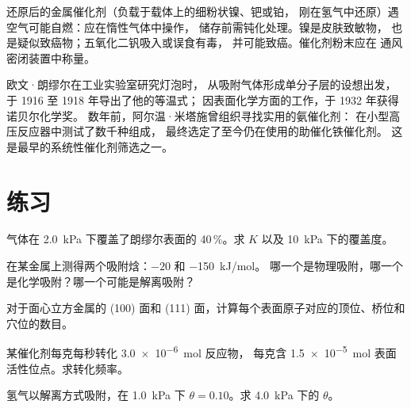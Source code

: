 \begin{safety}{}
还原后的金属催化剂（负载于载体上的细粉状镍、钯或铂，
刚在氢气中还原）遇空气可能自燃：应在惰性气体中操作，
储存前需钝化处理。镍是皮肤致敏物，
也是疑似致癌物；五氧化二钒吸入或误食有毒，
并可能致癌。催化剂粉末应在
通风密闭装置中称量。
\end{safety}

\begin{history}[朗缪尔与氨催化剂]
欧文·朗缪尔在工业实验室研究灯泡时，
从吸附气体形成单分子层的设想出发，于 1916 至 1918 年导出了他的等温式；
因表面化学方面的工作，于 1932 年获得诺贝尔化学奖。
数年前，阿尔温·米塔施曾组织寻找实用的氨催化剂：
在小型高压反应器中测试了数千种组成，
最终选定了至今仍在使用的助催化铁催化剂。
这是最早的系统性催化剂筛选之一。
\end{history}

\section{练习}

\begin{exercise}[$\star$]\label{exo:b3:surfaces-catalysis:1}
气体在 \qty{2.0}{kPa} 下覆盖了朗缪尔表面的 40\,\%。求 $K$ 以及
\qty{10}{kPa} 下的覆盖度。
\end{exercise}

\begin{exercise}[$\star$]\label{exo:b3:surfaces-catalysis:2}
在某金属上测得两个吸附焓：$-20$ 和 \qty{-150}{kJ/mol}。
哪一个是物理吸附，哪一个是化学吸附？哪一个可能是解离吸附？
\end{exercise}

\begin{exercise}[$\star$]\label{exo:b3:surfaces-catalysis:3}
对于面心立方金属的 (100) 面和
(111) 面，计算每个表面原子对应的顶位、桥位和穴位的数目。
\end{exercise}

\begin{exercise}[$\star$]\label{exo:b3:surfaces-catalysis:4}
某催化剂每克每秒转化 \qty{3.0e-6}{mol} 反应物，
每克含 \qty{1.5e-5}{mol} 表面活性位点。求转化频率。
\end{exercise}

\begin{exercise}[$\star\star$]\label{exo:b3:surfaces-catalysis:5}
氢气以解离方式吸附，在 \qty{1.0}{kPa} 下 $\theta = 0.10$。求 \qty{4.0}{kPa} 下的 $\theta$。
\end{exercise}

